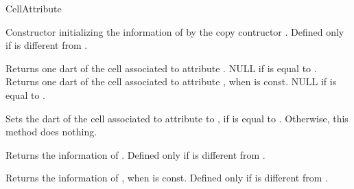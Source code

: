 \begin{ccRefConcept}{CellAttribute}
\ccCreation
{}


 {Constructor initializing the information of  by the 
   copy contructor .
   Defined only if  is different from .}


    {Returns one dart of the cell associated to attribute . 
     NULL if  is equal to .}
\ccGlue
{} 
   {Returns one dart of the cell associated to attribute , 
    when  is const. 
    NULL if  is equal to .}

    {Sets the dart of the cell associated to attribute  to , 
      if  is equal to .
      Otherwise, this method does nothing.
}

  {Returns the information of . 
    Defined only if  is different from .}

  {Returns the information of , when  is const.
    Defined only if  is different from .}

\ccHasModels
{}



\ccSeeAlso
\\

\end{ccRefConcept}
\ccRefPageEnd
